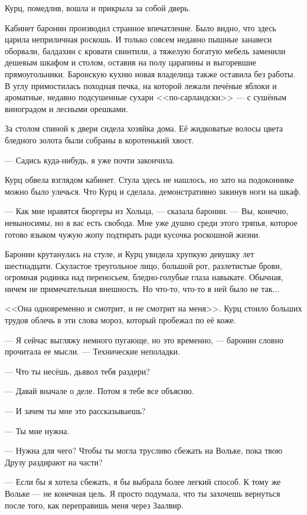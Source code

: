 Курц, помедлив, вошла и прикрыла за собой дверь.

Кабинет баронин производил странное впечатление.
Было видно, что здесь царила неприличная роскошь.
И только совсем недавно пышные занавеси оборвали, балдахин с кровати свинтили, а тяжелую богатую мебель заменили дешевым шкафом и столом, оставив на полу царапины и выгоревшие прямоугольники.
Баронскую кухню новая владелица также оставила без работы.
В углу примостилась походная печка, на которой лежали печёные яблоки и ароматные, недавно подсушенные сухари <<по-сарландски>> --- с сушёным виноградом и лесными орешками.

За столом спиной к двери сидела хозяйка дома.
Её жидковатые волосы цвета бледного золота были собраны в коротенький хвост.

--- Садись куда-нибудь, я уже почти закончила.

Курц обвела взглядом кабинет.
Стула здесь не нашлось, но зато на подоконнике можно было улечься.
Что Курц и сделала, демонстративно закинув ноги на шкаф.

--- Как мне нравятся бюргеры из Хольца, --- сказала баронин.
--- Вы, конечно, невыносимы, но в вас есть свобода.
Мне уже душно среди этого тряпья, которое готово языком чужую жопу подтирать ради кусочка роскошной жизни.

Баронин крутанулась на стуле, и Курц увидела хрупкую девушку лет шестнадцати.
Скуластое треугольное лицо, большой рот, разлетистые брови, огромная родинка над переносьем, бледно-голубые глаза навыкате.
Обычная, ничем не примечательная внешность.
Но что-то, что-то в ней было не так...

<<Она одновременно и смотрит, и не смотрит на меня>>.
Курц стоило больших трудов облечь в эти слова мороз, который пробежал по её коже.

--- Я сейчас выгляжу немного пугающе, но это временно, --- баронин словно прочитала ее мысли.
--- Технические неполадки.

--- Что ты несёшь, дьявол тебя раздери?

--- Давай вначале о деле.
Потом я тебе все объясню.

\asterism

--- И зачем ты мне это рассказываешь?

--- Ты мне нужна.

--- Нужна для чего?
Чтобы ты могла трусливо сбежать на Вольке, пока твою Друзу раздирают на части?

--- Если бы я хотела сбежать, я бы выбрала более легкий способ.
К тому же Вольке --- не конечная цель.
Я просто подумала, что ты захочешь вернуться после того, как переправишь меня через Заалвир.


